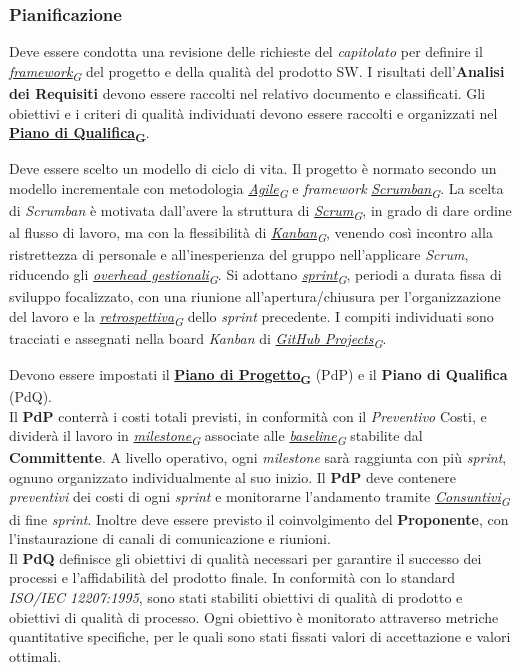 \documentclass[12pt, a4paper]{article}
\newcommand{\urlglossario}{https://skynetunigroup.github.io/Code_Guardian/Documentazione/PB/glossario_v2.0.0.pdf} %
\newcommand{\glo}[2]{\href{\urlglossario\#nameddest=#2}{#1\textsubscript{G}}}
\begin{document}
\subsubsection{Pianificazione}
Deve essere condotta una revisione delle richieste del \textit{capitolato} per definire il \textit{\glo{framework}{framework}} del progetto e della qualità del prodotto SW. I risultati dell'\textbf{Analisi dei Requisiti} devono essere raccolti nel relativo documento e classificati. Gli obiettivi e i criteri di qualità individuati devono essere raccolti e organizzati nel \textbf{\glo{Piano di Qualifica}{piano-di-qualifica}}.

Deve essere scelto un modello di ciclo di vita. Il progetto è normato secondo un modello incrementale con metodologia \textit{\glo{Agile}{agile}} e \textit{framework} \textit{\glo{Scrumban}{scrumban}}. La scelta di \textit{Scrumban} è motivata dall'avere la struttura di \textit{\glo{Scrum}{scrum}}, in grado di dare ordine al flusso di lavoro, ma con la flessibilità di \textit{\glo{Kanban}{kanban}}, venendo così incontro alla ristrettezza di personale e all'inesperienza del gruppo nell'applicare \textit{Scrum}, riducendo gli \textit{\glo{overhead gestionali}{overhead-gestionali}}. Si adottano \textit{\glo{sprint}{sprint}}, periodi a durata fissa di sviluppo focalizzato, con una riunione all'apertura/chiusura per l'organizzazione del lavoro e la \textit{\glo{retrospettiva}{retrospettiva}} dello \textit{sprint} precedente. I compiti individuati sono tracciati e assegnati nella board \textit{Kanban} di \textit{\glo{GitHub Projects}{github-projects}}. 

Devono essere impostati il \textbf{\glo{Piano di Progetto}{piano-di-progetto}} (PdP) e il \textbf{Piano di Qualifica} (PdQ).\\
Il \textbf{PdP} conterrà i costi totali previsti, in conformità con il \textit{Preventivo} Costi, e dividerà il lavoro in \textit{\glo{milestone}{milestone}} associate alle \textit{\glo{baseline}{baseline}} stabilite dal \textbf{Committente}. A livello operativo, ogni \textit{milestone} sarà raggiunta con più \textit{sprint}, ognuno organizzato individualmente al suo inizio. Il \textbf{PdP} deve contenere \textit{preventivi} dei costi di ogni \textit{sprint} e monitorarne l'andamento tramite \textit{\glo{Consuntivi}{consuntivo}} di fine \textit{sprint}. Inoltre deve essere previsto il coinvolgimento del \textbf{Proponente}, con l'instaurazione di canali di comunicazione e riunioni.\\
Il \textbf{PdQ} definisce gli obiettivi di qualità necessari per garantire il successo dei processi e l'affidabilità del prodotto finale. In conformità con lo standard \textit{ISO/IEC 12207:1995}, sono stati stabiliti obiettivi di qualità di prodotto e obiettivi di qualità di processo. Ogni obiettivo è monitorato attraverso metriche quantitative specifiche, per le quali sono stati fissati valori di accettazione e valori ottimali.
\end{document}

